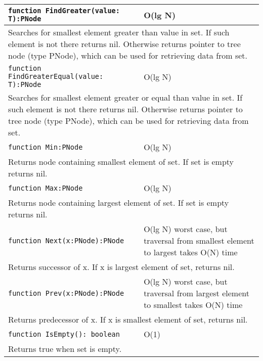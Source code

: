 \begin{longtable}{|m{10cm}|m{5cm}|}
\verb!function FindGreater(value: T):PNode! & O(lg N) \\\hline
\multicolumn{2}{|m{15cm}|}{Searches for smallest element greater than value in set. If such element is not there returns nil. Otherwise
returns pointer to tree node (type PNode), which can be used for retrieving data from set.} \\\hline\hline

\verb!function FindGreaterEqual(value: T):PNode! & O(lg N) \\\hline
\multicolumn{2}{|m{15cm}|}{Searches for smallest element greater or equal than value in set. If such element is not there returns nil. Otherwise
returns pointer to tree node (type PNode), which can be used for retrieving data from set.} \\\hline\hline

\verb!function Min:PNode! & O(lg N) \\\hline
\multicolumn{2}{|m{15cm}|}{Returns node containing smallest element of set. If set is empty returns
nil.} \\\hline\hline

\verb!function Max:PNode! & O(lg N) \\\hline
\multicolumn{2}{|m{15cm}|}{Returns node containing largest element of set. If set is empty returns
nil.} \\\hline\hline

\verb!function Next(x:PNode):PNode! & O(lg N) worst case, but traversal from smallest element to
largest takes O(N) time \\\hline
\multicolumn{2}{|m{15cm}|}{Returns successor of x. If x is largest element of set, returns nil.} \\\hline\hline

\verb!function Prev(x:PNode):PNode! & O(lg N) worst case, but traversal from largest element to
smallest takes O(N) time \\\hline
\multicolumn{2}{|m{15cm}|}{Returns predecessor of x. If x is smallest element of set, returns nil.} \\\hline\hline

\verb!function IsEmpty(): boolean! & O(1) \\ \hline
\multicolumn{2}{|m{15cm}|}{Returns true when set is empty.} \\\hline

\end{longtable}
